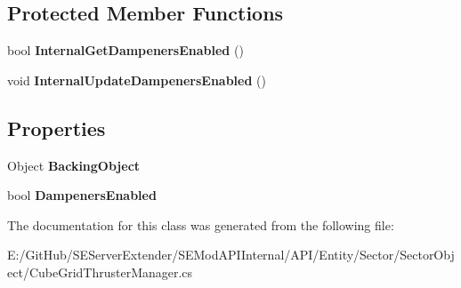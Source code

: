 \subsection*{Protected Member Functions}
\begin{DoxyCompactItemize}
\item 
\hypertarget{class_s_e_mod_a_p_i_internal_1_1_a_p_i_1_1_entity_1_1_sector_1_1_sector_object_1_1_cube_grid_thruster_manager_ad392cefa70eda53269827faf8cbfcb5d}{}bool {\bfseries Internal\+Get\+Dampeners\+Enabled} ()\label{class_s_e_mod_a_p_i_internal_1_1_a_p_i_1_1_entity_1_1_sector_1_1_sector_object_1_1_cube_grid_thruster_manager_ad392cefa70eda53269827faf8cbfcb5d}

\item 
\hypertarget{class_s_e_mod_a_p_i_internal_1_1_a_p_i_1_1_entity_1_1_sector_1_1_sector_object_1_1_cube_grid_thruster_manager_aeb925e4f1a59bed3d15cf9801541ac6d}{}void {\bfseries Internal\+Update\+Dampeners\+Enabled} ()\label{class_s_e_mod_a_p_i_internal_1_1_a_p_i_1_1_entity_1_1_sector_1_1_sector_object_1_1_cube_grid_thruster_manager_aeb925e4f1a59bed3d15cf9801541ac6d}

\end{DoxyCompactItemize}
\subsection*{Properties}
\begin{DoxyCompactItemize}
\item 
\hypertarget{class_s_e_mod_a_p_i_internal_1_1_a_p_i_1_1_entity_1_1_sector_1_1_sector_object_1_1_cube_grid_thruster_manager_a0c2a0f5fd3b3113b6e7629a405d7f966}{}Object {\bfseries Backing\+Object}\label{class_s_e_mod_a_p_i_internal_1_1_a_p_i_1_1_entity_1_1_sector_1_1_sector_object_1_1_cube_grid_thruster_manager_a0c2a0f5fd3b3113b6e7629a405d7f966}

\item 
\hypertarget{class_s_e_mod_a_p_i_internal_1_1_a_p_i_1_1_entity_1_1_sector_1_1_sector_object_1_1_cube_grid_thruster_manager_acc2db616c44e5d00ba9c007dd02b7968}{}bool {\bfseries Dampeners\+Enabled}\label{class_s_e_mod_a_p_i_internal_1_1_a_p_i_1_1_entity_1_1_sector_1_1_sector_object_1_1_cube_grid_thruster_manager_acc2db616c44e5d00ba9c007dd02b7968}

\end{DoxyCompactItemize}


The documentation for this class was generated from the following file\+:\begin{DoxyCompactItemize}
\item 
E\+:/\+Git\+Hub/\+S\+E\+Server\+Extender/\+S\+E\+Mod\+A\+P\+I\+Internal/\+A\+P\+I/\+Entity/\+Sector/\+Sector\+Object/Cube\+Grid\+Thruster\+Manager.\+cs\end{DoxyCompactItemize}
